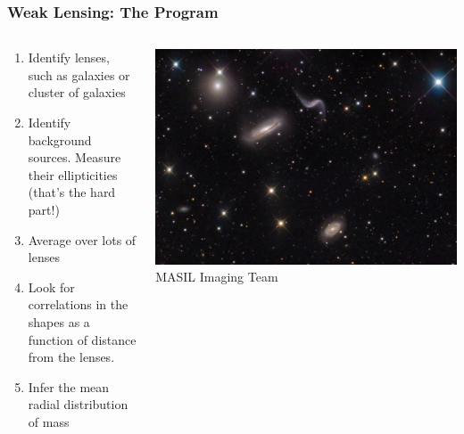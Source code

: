\documentclass{beamer}
\begin{document}
\frame
{
    \frametitle{Weak Lensing: The Program}

    \begin{columns}
        \begin{column}{0.5\textwidth}    
            \begin{enumerate}

                \item Identify lenses, such as galaxies or cluster of galaxies

                \item Identify background sources. Measure their ellipticities
                    {\color{gold}(that's the hard part!)}

                \item Average over lots of lenses

                \item Look for correlations in the shapes as a function of
                    distance from the lenses.


                \item Infer the mean radial distribution of mass

            \end{enumerate}
        \end{column}
        \begin{column}{0.5\textwidth}
            \begin{center}
                \includegraphics[width=\textwidth]{hickson44_masil_big.jpg}
                \newline
                {\tiny MASIL Imaging Team}
            \end{center}
        \end{column}
    \end{columns}
}
\end{document}
